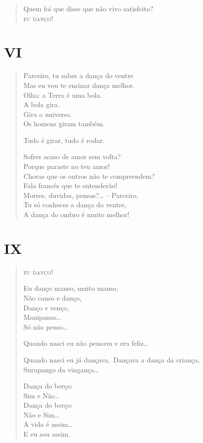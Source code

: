{\begin{verse}
Quem foi que disse que não vivo satisfeito?\\
\textsc{eu danço}!
\end{verse}

\pagebreak
\section*{VI}

\begin{verse}
Parceiro, tu sabes a dança do ventre\\
Mas eu vou te ensinar dança melhor.\\
Olha: a Terra é uma bola.\\
\qquad\qquad\quad\quad A bola gira.\\
\qquad\qquad Gira o universo.\\
\qquad Os homens giram também.

Tudo é girar, tudo é rodar.

\quad Sofres acaso de amor sem volta?\\
\quad Porque paraste no teu amor!\\
\qquad\quad Choras que os outros não te compreendem?\\
\qquad\quad Fala francês que te entenderão!\\
\qquad\qquad\quad Morres, duvidas, pensas?\ldots{} -- Parceiro,\\
Tu só conheces a dança do ventre,\\
A dança do ombro é muito melhor!
\end{verse}

\pagebreak
\section*{IX}

\begin{verse}
\textsc{eu danço!}

Eu danço manso, muito manso,\\
Não canso e danço,\\
Danço e venço,\\
\qquad Manipanso\ldots{}\\
\qquad\quad Só não penso\ldots{}

Quando nasci eu não pensava e era feliz\ldots{}

Quando nasci eu já dançava,\
Dançava a dança da criança,\\
\qquad Surupango da vingança\ldots{}

Dança do berço:\\
\qquad Sim e Não\ldots{}\\
Dança do berço:\\
\qquad Não e Sim\ldots{}\\
\qquad\quad A vida é assim\ldots{}\\
E eu sou assim.


\end{verse}}
